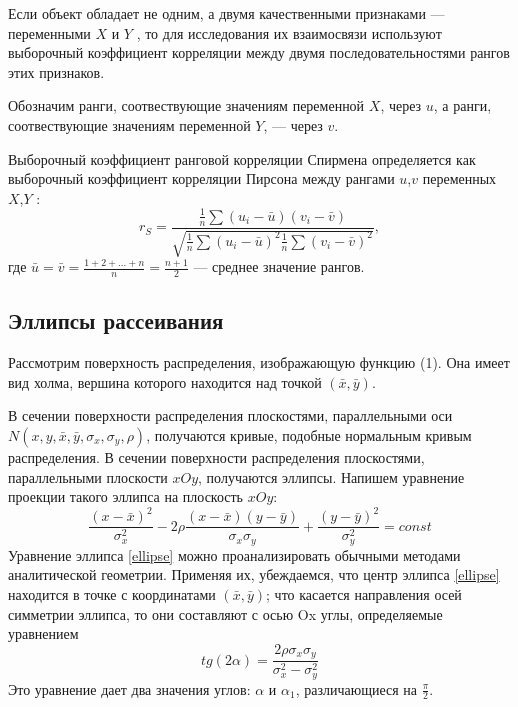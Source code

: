 \documentclass[12pt]{article}
\begin{document}
	Если объект обладает не одним, а двумя качественными признаками — переменными $X$ и $Y$ , то для исследования их взаимосвязи используют выборочный коэффициент корреляции между двумя последовательностями рангов этих признаков.
	
	Обозначим ранги, соотвествующие значениям переменной $X$, через $u$, а ранги, соотвествующие значениям переменной $Y$, — через $v$.
	
	Выборочный коэффициент ранговой корреляции Спирмена определяется как выборочный коэффициент корреляции Пирсона между рангами $u$,$v$ переменных $X$,$Y$ :
	\begin{equation}
		r_{S} = \frac{
			\frac{1}{n}\sum{(u_{i} - \bar{u})(v_{i}-\bar{v})}
		}{
			\sqrt{\frac{1}{n}\sum{(u_{i} - \bar{u})^{2}}\frac{1}{n}\sum{(v_{i} - \bar{v})^{2}}}
		},
		\label{rS}
	\end{equation}
	где $\bar{u} = \bar{v} = \frac{1 + 2 + ... + n}{n} = \frac{n + 1}{2}$ — среднее значение рангов.
	\subsection{Эллипсы рассеивания}
	Рассмотрим поверхность распределения, изображающую функцию (1). Она имеет вид холма, вершина которого находится над точкой $(\bar{x},\bar{y})$.
	
	В сечении поверхности распределения плоскостями, параллельными оси $ N(x, y, \bar{x}, \bar{y}, \sigma_{x}, \sigma_{y}, \rho)$, получаются кривые, подобные нормальным кривым распределения. В сечении поверхности распределения плоскостями, параллельными плоскости $xOy$, получаются эллипсы. Напишем уравнение проекции такого эллипса на плоскость $xOy$: 
	\begin{equation}
		\frac{(x-\bar{x})^{2}}{\sigma_{x}^{2}} - 
		2\rho\frac{(x-\bar{x})(y-\bar{y})}{\sigma_{x}\sigma_{y}}+
		\frac{(y-\bar{y})^{2}}{\sigma_{y}^{2}} = const
		\label{ellipse}
	\end{equation}
	Уравнение эллипса \ref{ellipse} можно проанализировать обычными методами аналитической геометрии. Применяя их, убеждаемся, что центр эллипса \ref{ellipse} находится в точке с координатами $(\bar{x},\bar{y})$; что касается направления осей симметрии эллипса, то они составляют с осью Ox углы, определяемые уравнением
	\begin{equation}
		tg(2\alpha) = \frac{2\rho\sigma_{x}\sigma_{y}}{\sigma_{x}^{2} - \sigma_{y}^{2}}
		\label{angle}
	\end{equation}
	Это уравнение дает два значения углов: $\alpha$ и $\alpha_{1}$, различающиеся на $\frac{\pi}{2}$.
	
\end{document}
